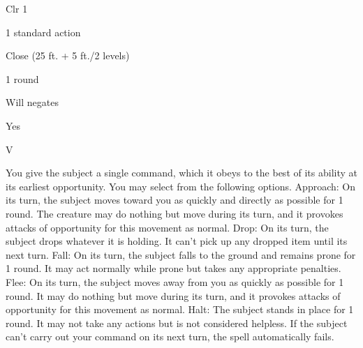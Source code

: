 
\begin{description*}
\item[Level:] Clr 1
\item[Casting Time:] 1 standard action
\item[Range:] Close (25 ft. + 5 ft./2 levels)
\item[Duration:] 1 round
\item[Saving Throw:] Will negates
\item[Spell Resistance:] Yes
\item[Components:] V
\end{description*}

You give the subject a single command, which it obeys to the best of its ability
at its earliest opportunity. You may select from the following options.
Approach: On its turn, the subject moves toward you as quickly and directly
as possible for 1 round. The creature may do nothing but move during its turn,
and it provokes attacks of opportunity for this movement as normal.
Drop: On its turn, the subject drops whatever it is holding. It can't
pick up any dropped item until its next turn.
Fall: On its turn, the subject falls to the ground and remains prone for
1 round. It may act normally while prone but takes any appropriate penalties.
Flee: On its turn, the subject moves away from you as quickly as possible
for 1 round. It may do nothing but move during its turn, and it provokes attacks
of opportunity for this movement as normal.
Halt: The subject stands in place for 1 round. It may not take any actions
but is not considered helpless.
If the subject can't carry out your command on its next turn, the spell automatically
fails.